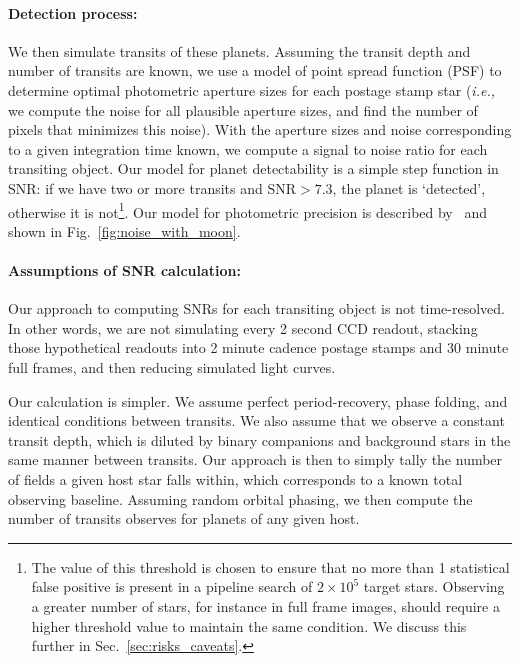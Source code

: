 \paragraph{Detection process:}
We then simulate transits of these planets.  Assuming the transit
depth and number of transits are known, we use a model of \tesss point
spread function (PSF) to determine optimal photometric aperture sizes
for each postage stamp star (\textit{i.e.,} we compute the noise for
all plausible aperture sizes, and find the number of pixels that
minimizes this noise).  With the aperture sizes and noise
corresponding to a given integration time known, we compute a signal
to noise ratio for each transiting object.  Our model for planet
detectability is a simple step function in SNR: if we have two or more
transits and $\text{SNR} > 7.3$, the planet is `detected', otherwise
it is not\footnote{The value of this threshold is chosen to
  ensure that no more than 1 statistical false positive is present in
  a pipeline search of $2\times10^5$ target stars. Observing a
  greater number of stars, for instance in full frame images, should
  require a higher threshold value to maintain the same condition. We
  discuss this further in Sec.~\protect\ref{sec:risks_caveats}.}.  Our model for
\tesss photometric precision is described
by~ and shown in
Fig.~\ref{fig:noise_with_moon}.

\paragraph{Assumptions of SNR calculation:}
Our approach to computing SNRs for each transiting object is not
time-resolved.  In other words, we are not simulating every 2 second
CCD readout, stacking those hypothetical readouts into 2 minute
cadence postage stamps and 30 minute full frames, and then reducing
simulated light curves.

Our calculation is simpler.  We assume perfect period-recovery, phase
folding, and identical conditions between transits.  We also assume
that we observe a constant transit depth, which is diluted by binary
companions and background stars in the same manner between transits.
Our approach is then to simply tally the number of \tess fields a
given host star falls within, which corresponds to a known total
observing baseline.  Assuming random orbital phasing, we then compute
the number of transits \tess observes for planets of any given host.

